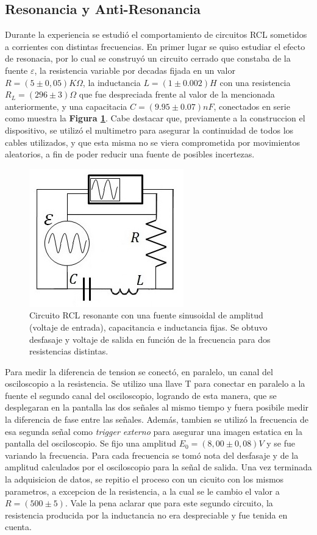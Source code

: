 \documentclass[11pt,a4paper]{article}
\begin{document}
\subsection{Resonancia y Anti-Resonancia}
Durante la experiencia se estudió el comportamiento de circuitos RCL sometidos a corrientes con distintas frecuencias. En primer lugar se quiso estudiar el efecto de resonacia, por lo cual se construyó un circuito cerrado que constaba de la fuente $\varepsilon$, la resistencia variable por decadas fijada en un valor $R = (5 \pm 0,05)K\Omega$, la inductancia $L = (1 \pm 0.002)H$ con una resistencia $R_{L}= (296\pm 3)\Omega$ que fue despreciada frente al valor de la mencionada anteriormente, y una capacitacia $C = (9.95 \pm 0.07)nF$, conectados en serie como muestra la \textbf{Figura \ref{fig:RCL-Res}}. Cabe destacar que, previamente a la construccion el dispositivo,  se utilizó el multimetro para asegurar la continuidad de todos los cables utilizados, y que esta misma no se viera comprometida por movimientos aleatorios, a fin de poder reducir una fuente de posibles incertezas.

\begin{figure}[h]
\centering
\includegraphics[scale=0.7]{Circuito-RCL-Resonante}
  \caption{Circuito RCL resonante con una fuente sinusoidal de amplitud (voltaje de entrada), capacitancia e inductancia fijas. Se obtuvo desfasaje y voltaje de salida en función de la frecuencia para dos resistencias distintas.}
  \label{fig:RCL-Res}
\end{figure}

Para medir la diferencia de tension se conectó, en paralelo, un canal del osciloscopio a la resistencia. Se utilizo una llave T para conectar en paralelo a la fuente el segundo canal del osciloscopio, logrando de esta manera, que se desplegaran en la pantalla las dos señales al mismo tiempo y fuera posibile medir la diferencia de fase entre las señales. Además, tambien se utilizó la frecuencia de esa segunda señal como \textit{trigger externo} para asegurar una imagen estatica en la pantalla del osciloscopio. Se fijo una amplitud $E_{0} = (8,00 \pm 0,08)V$ y se fue variando la frecuencia. Para cada frecuencia se tomó nota del desfasaje y de la amplitud calculados por el osciloscopio para la señal de salida. Una vez terminada la adquisicion de datos, se repitio el proceso con un cicuito con los mismos parametros, a excepcion de la resistencia, a la cual se le cambio el valor a $R = (500 \pm 5)$. Vale la pena aclarar que para este segundo circuito, la resistencia producida por la inductancia no era despreciable y fue tenida en cuenta.
\end{document}
